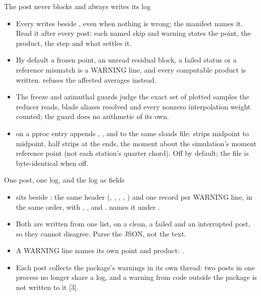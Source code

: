 \begin{frame}{The post never blocks and always writes its log}
\begin{itemize}\small
  \item Every  writes  beside
        , even when nothing is wrong; the manifest names it.
        Read it after every post: each named skip and warning states the point,
        the product, the step and what settles it.
  \item By default a frozen point, an unread residual block, a failed status or a
        reference mismatch is a WARNING line, and every computable product is
        written.  refuses the affected averages instead.
  \item The freeze and azimuthal guards judge the exact set of plotted samples the
        reducer reads, blade aliases resolved and every nonzero interpolation
        weight counted; the guard does no arithmetic of its own.
  \item {} on a  pproc
        entry appends , ,  and
         to the same sloads file: strips midpoint to midpoint,
        half strips at the ends, the moment about the simulation's moment reference point (not each station's quarter chord).
        Off by default; the file is byte-identical when off.
\end{itemize}
\end{frame}

\begin{frame}{One post, one log, and the log as fields}
\begin{itemize}\small
  \item {} sits beside : the same header
        (, , , ,
        ) and one record per WARNING line, in the same
        order, with , ,  and
        .  names it under .
  \item Both are written from one list, on a clean, a failed and an
        interrupted post, so they cannot disagree. Parse the JSON, not the text.
  \item A WARNING line names its own point and product:
        .
  \item Each post collects the package's warnings in its own thread: two posts
        in one process no longer share a log, and a warning from code outside
        the package is not written to it [3].
\end{itemize}
\end{frame}
